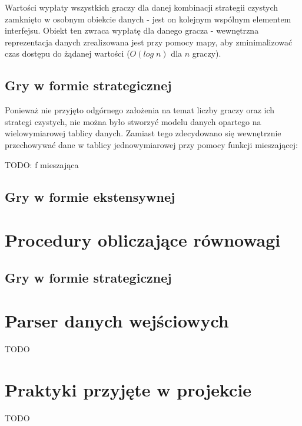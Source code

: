 \documentclass{standalone}
\begin{document}
Wartości wypłaty wszystkich graczy dla danej kombinacji strategii czystych zamknięto w osobnym obiekcie
danych - jest on kolejnym wspólnym elementem interfejsu. Obiekt ten zwraca wypłatę dla danego gracza -
wewnętrzna reprezentacja danych zrealizowana jest przy pomocy mapy, aby zminimalizować czas dostępu do
żądanej wartości ($O(log\;n)$ dla $n$ graczy).

\subsection{Gry w formie strategicznej}

Ponieważ nie przyjęto odgórnego założenia na temat liczby graczy oraz ich strategi czystych, nie można było
stworzyć modelu danych opartego na wielowymiarowej tablicy danych. Zamiast tego zdecydowano się wewnętrznie
przechowywać dane w tablicy jednowymiarowej przy pomocy funkcji mieszającej: 

TODO: f mieszająca

\subsection{Gry w formie ekstensywnej}

\section{Procedury obliczające równowagi}

\subsection{Gry w formie strategicznej}

\section{Parser danych wejściowych}

TODO

\section{Praktyki przyjęte w projekcie}

TODO
\end{document}
